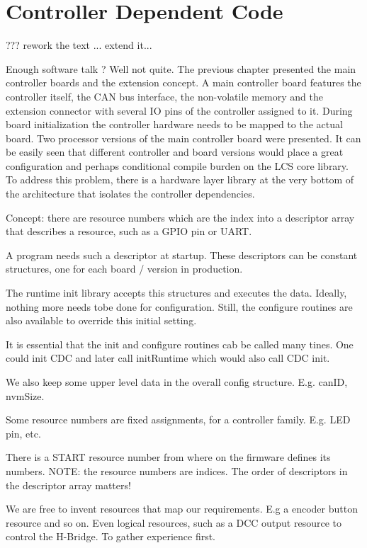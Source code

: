 
\chapter{Controller Dependent Code}

??? rework the text ... extend it...

Enough software talk ? Well not quite. The previous chapter presented the main controller boards and the extension concept. A main controller board features the controller itself, the CAN bus interface, the non-volatile memory and the extension connector with several IO pins of the controller assigned to it. During board initialization the controller hardware needs to be mapped to the actual board. Two processor versions of the main controller board were presented. It can be easily seen that different controller and board versions would place a great configuration and perhaps conditional compile burden on the LCS core library. To address this problem, there is a hardware layer library at the very bottom of the architecture that isolates the controller dependencies.


Concept: there are resource numbers which are the index into a descriptor array that describes a resource, such as a GPIO pin or UART.

A program needs such a descriptor at startup. These descriptors can be constant structures, one for each board / version in production. 

The runtime init library accepts this structures and executes the data. Ideally, nothing more needs tobe done for configuration. Still, the configure routines are also available to override this initial setting.

It is essential that the init and configure routines cab be called many tines. One could init CDC and later call initRuntime which would also call CDC init. 

We also keep some upper level data in the overall config structure. E.g. canID, nvmSize.

Some resource numbers are fixed assignments, for a controller family. E.g. LED pin, etc.

There is a START resource number from where on the firmware defines its numbers.
NOTE: the resource numbers are indices. The order of descriptors in the descriptor array matters! 

We are free to invent resources that map our requirements. E.g a encoder button resource and so on. Even logical resources, such as a DCC output resource to control the H-Bridge. To gather experience first.

